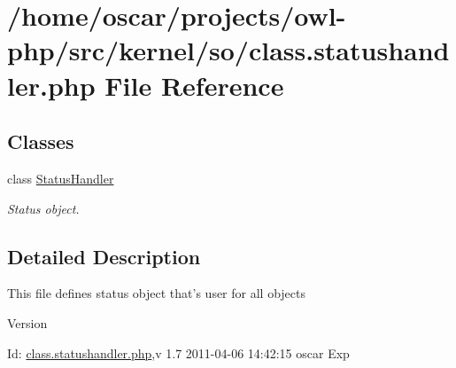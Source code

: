 \section{/home/oscar/projects/owl-\/php/src/kernel/so/class.statushandler.php File Reference}
\label{class_8statushandler_8php}
\subsection*{Classes}
\begin{DoxyCompactItemize}
\item 
class \hyperlink{classStatusHandler}{StatusHandler}
\begin{DoxyCompactList}\small\item\em Status object. \item\end{DoxyCompactList}\end{DoxyCompactItemize}


\subsection{Detailed Description}
This file defines status object that's user for all objects \begin{DoxyVersion}{Version}

\end{DoxyVersion}
\begin{DoxyParagraph}{Id:}
\hyperlink{class_8statushandler_8php}{class.statushandler.php},v 1.7 2011-\/04-\/06 14:42:15 oscar Exp 
\end{DoxyParagraph}
